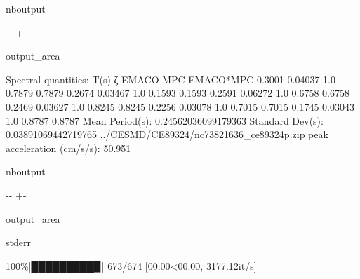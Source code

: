 \documentclass[letterpaper,10pt,english]{sphinxmanual}
\begin{document}
\begin{sphinxuseclass}{nboutput}
{

\kern-\sphinxverbatimsmallskipamount\kern-\baselineskip
\kern+\FrameHeightAdjust\kern-\fboxrule
\vspace{\nbsphinxcodecellspacing}

\begin{sphinxuseclass}{output_area}
\begin{sphinxuseclass}{}


\begin{sphinxVerbatim}[commandchars=\\\{\}]
Spectral quantities:
       T(s)        ζ        EMACO        MPC     EMACO*MPC
      0.3001     0.04037    1.0        0.7879     0.7879
      0.2674     0.03467    1.0        0.1593     0.1593
      0.2591     0.06272    1.0        0.6758     0.6758
      0.2469     0.03627    1.0        0.8245     0.8245
      0.2256     0.03078    1.0        0.7015     0.7015
      0.1745     0.03043    1.0        0.8787     0.8787
Mean Period(s): 0.24562036099179363
Standard Dev(s): 0.03891069442719765
../CESMD/CE89324/nc73821636\_ce89324p.zip
peak acceleration (cm/s/s): 50.951
\end{sphinxVerbatim}



\end{sphinxuseclass}
\end{sphinxuseclass}
}

\end{sphinxuseclass}
\begin{sphinxuseclass}{nboutput}
{

\kern-\sphinxverbatimsmallskipamount\kern-\baselineskip
\kern+\FrameHeightAdjust\kern-\fboxrule
\vspace{\nbsphinxcodecellspacing}

\begin{sphinxuseclass}{output_area}
\begin{sphinxuseclass}{stderr}


\begin{sphinxVerbatim}[commandchars=\\\{\}]
100\%|█████████▉| 673/674 [00:00<00:00, 3177.12it/s]
\end{sphinxVerbatim}



\end{sphinxuseclass}
\end{sphinxuseclass}
}

\end{sphinxuseclass}
\end{document}
